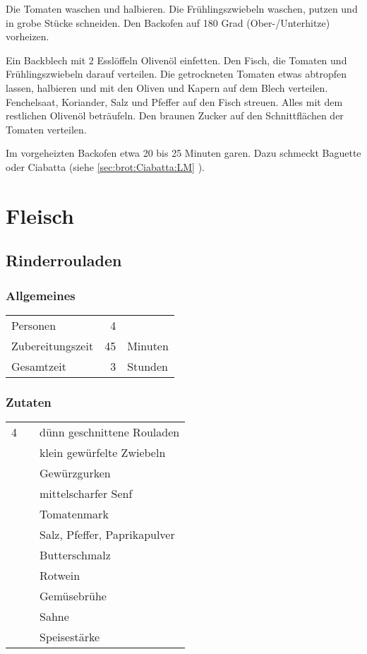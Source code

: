 Die Tomaten waschen und halbieren. Die Frühlingszwiebeln waschen, putzen und in grobe Stücke schneiden. Den Backofen auf 180 Grad (Ober-/Unterhitze) vorheizen.

Ein Backblech mit 2 Esslöffeln Olivenöl einfetten. Den Fisch, die Tomaten und Frühlingszwiebeln darauf verteilen. Die getrockneten Tomaten etwas abtropfen lassen, halbieren und mit den Oliven und Kapern auf dem Blech verteilen. Fenchelsaat, Koriander, Salz und Pfeffer auf den Fisch streuen. Alles mit dem restlichen Olivenöl beträufeln. Den braunen Zucker auf den Schnittflächen der Tomaten verteilen.

Im vorgeheizten Backofen etwa 20 bis 25 Minuten garen. Dazu schmeckt Baguette oder Ciabatta (siehe \vref{sec:brot:Ciabatta:LM} ).

\section{Fleisch}

\subsection{Rinderrouladen}
\subsubsection*{Allgemeines}
\begin{tabular}{lrl}
	Personen         &  4 &  \\
	Zubereitungszeit & 45 & Minuten \\
	Gesamtzeit       &  3 & Stunden \\
\end{tabular} 

\subsubsection*{Zutaten}
\begin{tabular}{rll}
	4 &  & dünn geschnittene Rouladen   \\
	  &  & klein gewürfelte Zwiebeln    \\
	  &  & Gewürzgurken                 \\
	  &  & mittelscharfer Senf          \\
	  &  & Tomatenmark                  \\
	  &  & Salz, Pfeffer, Paprikapulver \\
	  &  & Butterschmalz                \\
	  &  & Rotwein                      \\
	  &  & Gemüsebrühe					\\
	  &  & Sahne \\
	  & & Speisestärke
\end{tabular} 
